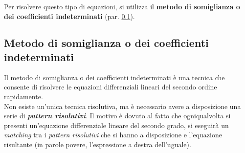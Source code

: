 \documentclass[a4paper]{article}
\begin{document}
	\noindent
	Per risolvere questo tipo di equazioni, si utilizza il \textbf{metodo di somiglianza o dei coefficienti indeterminati} (par. \ref{subsection: metodo di somiglianza o dei coefficienti indeterminati}).\newpage

	\subsection{Metodo di somiglianza o dei coefficienti indeterminati}\label{subsection: metodo di somiglianza o dei coefficienti indeterminati}
	Il metodo di somiglianza o dei coefficienti indeterminati è una tecnica che consente di risolvere le equazioni differenziali lineari del secondo ordine rapidamente.\\

	\noindent
	Non esiste un'unica tecnica risolutiva, ma è necessario avere a disposizione una serie di \textbf{\emph{pattern risolutivi}}. Il motivo è dovuto al fatto che ogniqualvolta si presenti un'equazione differenziale lineare del secondo grado, si eseguirà un \emph{matching} tra i \emph{pattern risolutivi} che si hanno a disposizione e l'equazione risultante (in parole povere, l'espressione a destra dell'uguale).\newline
\end{document}
